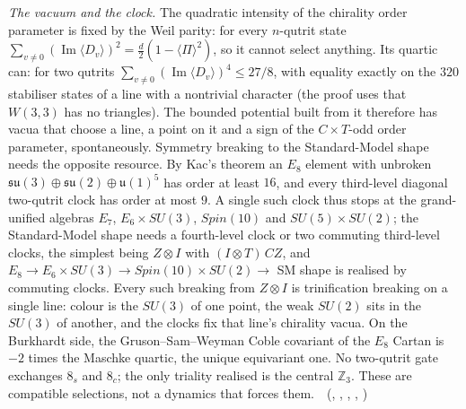 \emph{The vacuum and the clock.} The quadratic intensity of the chirality order parameter is fixed by the Weil parity: for every
$n$-qutrit state $\sum_{v\neq0}(\operatorname{Im}\langle D_v\rangle)^2=\tfrac d2(1-\langle\Pi\rangle^2)$, so it cannot select anything. Its quartic can: for
two qutrits $\sum_{v\neq0}(\operatorname{Im}\langle D_v\rangle)^4\le27/8$, with equality exactly on the $320$ stabiliser states of a line with a
nontrivial character (the proof uses that $W(3,3)$ has no triangles). The bounded potential built from it therefore has vacua that choose
a line, a point on it and a sign of the $C\times T$-odd order parameter, spontaneously. Symmetry breaking to the Standard-Model shape needs
the opposite resource. By Kac's theorem an $E_8$ element with unbroken $\mathfrak{su}(3)\oplus\mathfrak{su}(2)\oplus\mathfrak u(1)^5$ has order at
least $16$, and every third-level diagonal two-qutrit clock has order at most $9$. A single such clock thus stops at the grand-unified
algebras $E_7$, $E_6\times SU(3)$, $Spin(10)$ and $SU(5)\times SU(2)$; the Standard-Model shape needs a fourth-level clock or two commuting
third-level clocks, the simplest being $Z\otimes I$ with $(I\otimes T)\,CZ$, and $E_8\to E_6\times SU(3)\to Spin(10)\times SU(2)\to$ SM shape is
realised by commuting clocks. Every such breaking from $Z\otimes I$ is trinification breaking on a single line: colour is the $SU(3)$ of one
point, the weak $SU(2)$ sits in the $SU(3)$ of another, and the clocks fix that line's chirality vacua. On the Burkhardt side, the
Gruson--Sam--Weyman Coble covariant of the $E_8$ Cartan is $-2$ times the Maschke quartic, the unique equivariant one. No two-qutrit gate
exchanges $8_s$ and $8_c$; the only triality realised is the central $\mathbb Z_3$. These are compatible selections, not a dynamics that forces
them.
\tierT\,\tierC\ (, ,
, ,
)

